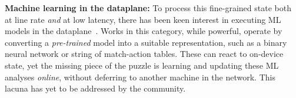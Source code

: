 \documentclass[
sigconf,natbib=false
,anonymous=true
]{acmart}
\newcommand{\fakepara}[1]{\noindent\textbf{#1:}}
\begin{document}


%
\fakepara{Machine learning in the dataplane}
To process this fine-grained state both at line rate \emph{and} at low latency, there has been keen interest in executing ML models in the dataplane~\parencite{DBLP:conf/hotnets/XiongZ19,DBLP:journals/corr/abs-2009-02353}.
Works in this category, while powerful, operate by converting a \emph{pre-trained} model into a suitable representation, such as a binary neural network or string of match-action tables.
These can react to on-device state, yet the missing piece of the puzzle is learning and updating these ML analyses \emph{online}, without deferring to another machine in the network.
This lacuna has yet to be addressed by the community.
\end{document}
